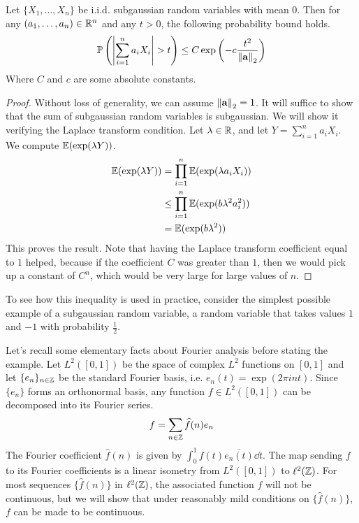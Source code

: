\documentclass[11pt]{article}
\begin{document}
\begin{theorem}
  \label{thm:hoeffding}
  Let $\{X_1, \ldots, X_n\}$ be i.i.d. subgaussian random variables with mean $0$.
  Then for any $(a_1, \ldots , a_n) \in \mathbb{R}^n$ and any $t > 0$, the following probability bound holds.
  \begin{align*}
    \mathbb{P}\left( \left| \sum_{i=1}^n a_i X_i \right| > t \right) \leq C \exp\left( -c \frac{t^2}{\left\lVert\mathbf{a}\right\rVert_2} \right)
  \end{align*}
  Where $C$ and $c$ are some absolute constants.
\end{theorem}
\begin{proof}
  Without loss of generality, we can assume $\left\lVert\mathbf{a}\right\rVert_2 = 1$.
  It will suffice to show that the sum of subgaussian random variables is subgaussian.
  We will show it verifying the Laplace transform condition.
  Let $\lambda \in \mathbb{R}$, and let $Y = \sum_{i=1}^n a_iX_i$.
  We compute $\mathbb{E}(\exp(\lambda Y))$.
  \begin{align*}
    \mathbb{E}(\exp(\lambda Y)) &= \prod_{i=1}^n \mathbb{E}(\exp(\lambda a_i X_i)) \\
                        &\leq \prod_{i=1}^n \mathbb{E}(\exp(b \lambda^2 a_i^2)) \\
                        &= \mathbb{E}(\exp(b\lambda^2))
  \end{align*}
  This proves the result. Note that having the Laplace transform coefficient equal to $1$ helped, because if the coefficient $C$ was greater than $1$, then we would pick up a constant of $C^n$, which would be very large for large values of $n$.
\end{proof}

To see how this inequality is used in practice, consider the simplest possible example of a subgaussian random variable, a random variable that takes values $1$ and $-1$ with probability $\frac{1}{2}$.

Let's recall some elementary facts about Fourier analysis before stating the example.
Let $L^2([0,1])$ be the space of complex $L^2$ functions on $[0,1]$ and let $\{e_n\}_{n \in \mathbb{Z}}$ be the standard Fourier basis, i.e. $e_n(t) = \exp(2\pi i nt)$.
Since $\{e_n\}$ forms an orthonormal basis, any function $f \in L^2([0,1])$ can be decomposed into its Fourier series.
\begin{align*}
  f = \sum_{n \in \mathbb{Z}} \widehat{f}(n) e_n
\end{align*}
The Fourier coefficient $\widehat{f}(n)$ is given by $\int_0^1 f(t) \overline{e_n(t)} \dd t$.
The map sending $f$ to its Fourier coefficients is a linear isometry from $L^2([0,1])$ to $\ell^2(\mathbb{Z})$.
For most sequences $\{\widehat{f}(n)\}$ in $\ell^2(\mathbb{Z})$, the associated function $f$ will not be continuous, but we will show that under reasonably mild conditions on $\{\widehat{f}(n)\}$, $f$ can be made to be continuous.
\end{document}
